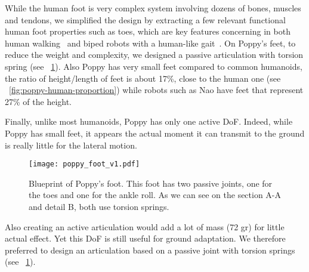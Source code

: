 While the human foot is very complex system involving dozens of bones, muscles and tendons, we simplified the design by extracting a few relevant functional human foot properties such as toes, which are key features concerning in both human walking~\cite{Hughes1990} and biped robots with a human-like gait~\cite{Sellaouti2006}. On Poppy's feet, to reduce the weight and complexity, we designed a passive articulation with torsion spring (see \figurename~\ref{fig:poppy-foot-v1-design}).
Also Poppy has very small feet compared to common humanoids, the ratio of height/length of feet is about 17\%,  close to the human one (see \figurename~\ref{fig:poppy-human-proportion}) while robots such as Nao have feet that represent 27\% of the height.



Finally, unlike most humanoids, Poppy has only one active DoF. Indeed, while Poppy has small feet, it appears the actual moment it can transmit to the ground is really little for the lateral motion.


\begin{figure}[p]
    \centering
        \texttt{[image: poppy\_foot\_v1.pdf]}
    \caption{Blueprint of Poppy's foot. This foot has two passive joints, one for the toes and one for the ankle roll. As we can see on the section A-A and detail B, both use torsion springs.}
    \label{fig:poppy-foot-v1-design}
\end{figure}

Also creating an active articulation would add a lot of mass (72 gr) for little actual effect. Yet this DoF is still useful for ground adaptation.
We therefore preferred to design an articulation based on a passive joint with torsion springs (see \figurename~\ref{fig:poppy-foot-v1-design}).

